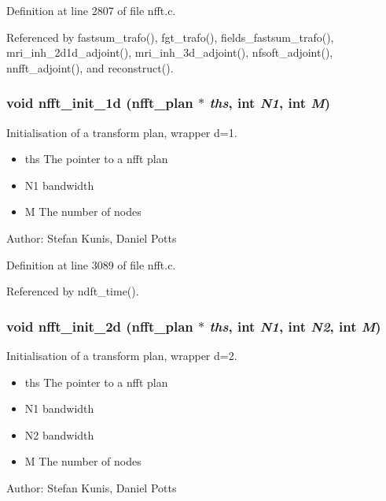 Definition at line 2807 of file nfft.c.

Referenced by fastsum\_\-trafo(), fgt\_\-trafo(), fields\_\-fastsum\_\-trafo(), mri\_\-inh\_\-2d1d\_\-adjoint(), mri\_\-inh\_\-3d\_\-adjoint(), nfsoft\_\-adjoint(), nnfft\_\-adjoint(), and reconstruct().\hypertarget{group__nfft_g01dbd2cfc9cc8577fc097e607e3c845f}{
\subsubsection{\setlength{\rightskip}{0pt plus 5cm}void nfft\_\-init\_\-1d ({\bf nfft\_\-plan} $\ast$ {\em ths}, int {\em N1}, int {\em M})}}
\label{group__nfft_g01dbd2cfc9cc8577fc097e607e3c845f}


Initialisation of a transform plan, wrapper d=1. 

\begin{itemize}
\item ths The pointer to a nfft plan \item N1 bandwidth \item M The number of nodes\end{itemize}
\begin{Desc}
\item[Author:]Stefan Kunis, Daniel Potts \end{Desc}


Definition at line 3089 of file nfft.c.

Referenced by ndft\_\-time().\hypertarget{group__nfft_g54ab08124f47fe412b2979abdc28cc16}{
\subsubsection{\setlength{\rightskip}{0pt plus 5cm}void nfft\_\-init\_\-2d ({\bf nfft\_\-plan} $\ast$ {\em ths}, int {\em N1}, int {\em N2}, int {\em M})}}
\label{group__nfft_g54ab08124f47fe412b2979abdc28cc16}


Initialisation of a transform plan, wrapper d=2. 

\begin{itemize}
\item ths The pointer to a nfft plan \item N1 bandwidth \item N2 bandwidth \item M The number of nodes\end{itemize}
\begin{Desc}
\item[Author:]Stefan Kunis, Daniel Potts \end{Desc}


